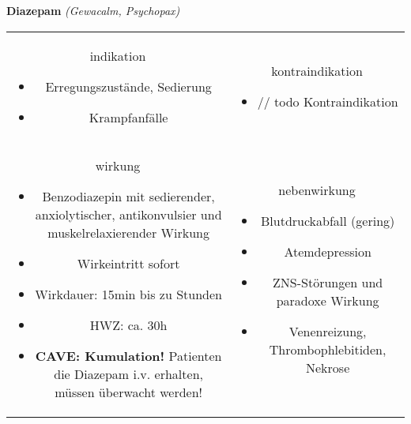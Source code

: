 \begin{frame}{
    \textbf{Diazepam}
    \textit{(Gewacalm, Psychopax)}
}
    \begin{tabular}{c c}
        \begin{beamercolorbox}[wd=\boxwidth\textwidth,ht=\boxheight\textheight,sep=1em]{indikation}
            \begin{itemize}
                \item Erregungszustände, Sedierung
                \item Krampfanfälle
            \end{itemize}
        \end{beamercolorbox} & 
        \begin{beamercolorbox}[wd=\boxwidth\textwidth,ht=\boxheight\textheight,sep=1em]{kontraindikation}
            \begin{itemize}
                \item // todo Kontraindikation 
            \end{itemize}
        \end{beamercolorbox} \\
        \begin{beamercolorbox}[wd=\boxwidth\textwidth,ht=\boxheight\textheight,sep=1em]{wirkung}
            \scriptsize
            \begin{itemize}
                \item Benzodiazepin mit sedierender, anxiolytischer, antikonvulsier und muskelrelaxierender Wirkung
                \item Wirkeintritt sofort
                \item Wirkdauer: 15min bis zu Stunden
                \item HWZ: ca. 30h
                \item \textbf{CAVE: Kumulation!} Patienten die Diazepam i.v. erhalten, müssen überwacht werden!
            \end{itemize}
        \end{beamercolorbox} & 
        \begin{beamercolorbox}[wd=\boxwidth\textwidth,ht=\boxheight\textheight,sep=1em]{nebenwirkung}
            \scriptsize
            \begin{itemize}
                \item Blutdruckabfall (gering)
                \item Atemdepression
                \item ZNS-Störungen und paradoxe Wirkung
                \item Venenreizung, Thrombophlebitiden, Nekrose
            \end{itemize}
        \end{beamercolorbox} \\
    \end{tabular}
\end{frame}

